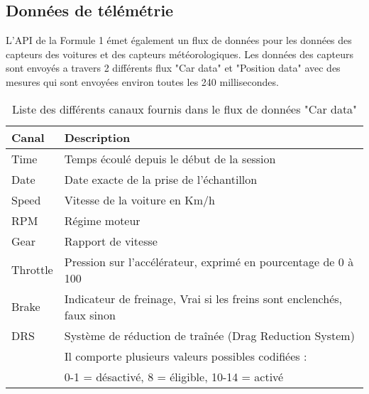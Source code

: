 \subsection{Données de télémétrie}
L'API de la Formule 1 émet également un flux de données pour les données des capteurs des voitures et des capteurs météorologiques.
Les données des capteurs sont envoyés a travers 2 différents flux "Car data" et "Position data" avec des mesures qui sont envoyées environ toutes les 240 millisecondes.
\begin{table}[H]
    \begin{center}
        \caption{Liste des différents canaux fournis dans le flux de données "Car data" \cite{fastf1documentation}}
        \begin{tabular}{l|l}
            Canal    & Description                                                            \\ \hline
            Time     & Temps écoulé depuis le début de la session                             \\
            Date     & Date exacte de la prise de l'échantillon                               \\
            Speed    & Vitesse de la voiture en Km/h                                          \\
            RPM      & Régime moteur                                                          \\
            Gear     & Rapport de vitesse                                                     \\
            Throttle & Pression sur l'accélérateur, exprimé en pourcentage de 0 à 100         \\
            Brake    & Indicateur de freinage, Vrai si les freins sont enclenchés, faux sinon \\
            DRS      & Système de réduction de traînée (Drag Reduction System)                \\
                     & Il comporte plusieurs valeurs possibles codifiées :                    \\
                     & 0-1 = désactivé, 8 = éligible, 10-14 = activé
        \end{tabular}
    \end{center}
\end{table}

